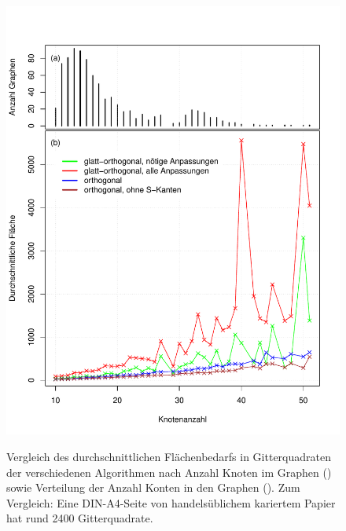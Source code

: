 \documentclass[a4paper]{scrreprt}
\theoremstyle{definition}
\begin{document}
\begin{figure}[p]
  \centering
  {\includegraphics[width=\textwidth]{area_comparison} \label{fig:graphSizes} \label{fig:areaComparison}}
  \caption{Vergleich des durchschnittlichen Flächenbedarfs in Gitterquadraten der verschiedenen Algorithmen nach Anzahl Knoten im Graphen () sowie  Verteilung der Anzahl Konten in den Graphen (). Zum Vergleich: Eine DIN-A4-Seite von handelsüblichem kariertem Papier hat rund 2400 Gitterquadrate.}
  \label{fig:areaComparisonAndGraphSizes}
\end{figure}
\end{document}

